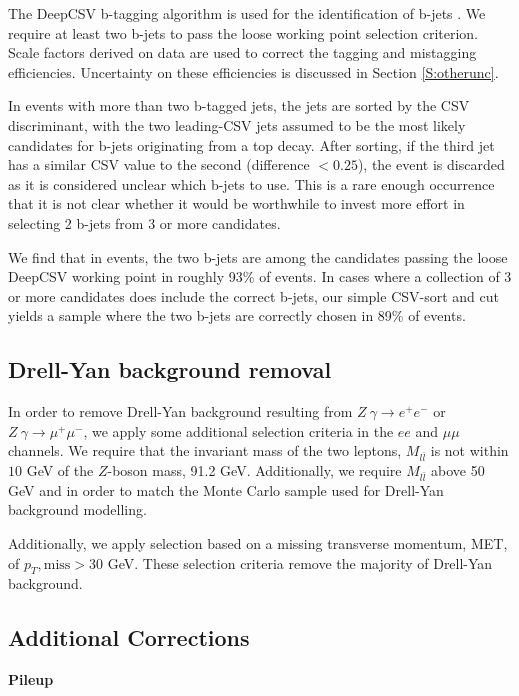 The DeepCSV b-tagging algorithm  is used for the identification of b-jets \cite{deepCSVref}. We require at least two b-jets to pass the loose working point selection criterion. Scale factors derived on data are used to correct the tagging and mistagging efficiencies. Uncertainty on these efficiencies is discussed in Section \ref{S:otherunc}.

 In events with more than two b-tagged jets, the jets are sorted by the CSV discriminant, with the two leading-CSV jets assumed to be the most likely candidates for b-jets originating from a top decay. After sorting, if the third jet has a similar CSV value to the second (difference $<0.25$), the event is discarded as it is considered unclear which b-jets to use. This is a rare enough occurrence that it is not clear whether it would be worthwhile to invest more effort in selecting 2 b-jets from 3 or more candidates. 
 
 We find that in \ttbar events, the two b-jets are among the candidates passing the loose DeepCSV working point in roughly 93\% of events. In cases where a collection of 3 or more candidates does include the correct b-jets, our simple CSV-sort and cut yields a \ttbar sample where the two b-jets are correctly chosen in 89\% of events.
   


\subsection*{Drell-Yan background removal}

In order to remove Drell-Yan background resulting from $Z\ \gamma \rightarrow e^+e^- $ or $Z \ \gamma \rightarrow \mu^+\mu^-$, we apply some additional selection criteria in the $ee$ and $\mu\mu$ channels. We require that the invariant mass of the two leptons, $M_{l\bar{l}}$ is not within $10$ \unit{GeV} of the $Z$-boson mass, 91.2 \unit{GeV}. Additionally, we require $M_{l\bar{l}}$  above 50\,GeV and in order to match the Monte Carlo sample used for Drell-Yan background modelling. 

Additionally, we apply selection based on a missing transverse momentum, MET, of $p_{T}\mathrm{,miss}>30$ \unit{GeV}. These selection criteria remove the majority of Drell-Yan background. 

\subsection{Additional Corrections}
\par \noindent
\textbf{Pileup }

